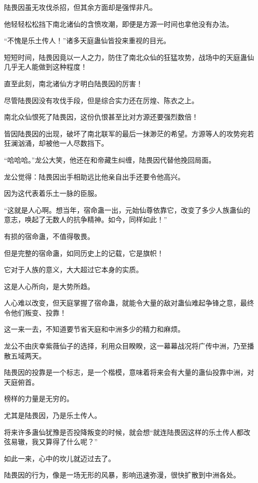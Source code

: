 
\begin{this_body}

陆畏因虽无攻伐杀招，但其余方面却是强悍非凡。

他轻轻松松挡下南北诸仙的含愤攻潮，即便是方源一时间也拿他没有办法。

“不愧是乐土传人！”诸多天庭蛊仙皆投来重视的目光。

短短时间，陆畏因竟以一人之力，防住了南北众仙的狂猛攻势，战场中的天庭蛊仙几乎无人能做到这种程度！

直至此刻，南北诸仙方才明白陆畏因的厉害！

尽管陆畏因没有攻伐手段，但是综合实力还在厉煌、陈衣之上。

南北众仙恨死了陆畏因，这份仇恨甚至比对方源还要强烈数倍！

皆因陆畏因的出现，破坏了南北联军的最后一抹渺茫的希望。方源等人的攻势宛若狂澜汹涌，却被他一人尽数挡下。

“哈哈哈。”龙公大笑，他还在和帝藏生纠缠，陆畏因代替他挽回局面。

龙公觉得：陆畏因出手相助远比他亲自出手还要令他高兴。

因为这代表着乐土一脉的臣服。

“这就是人心啊。想当年，宿命蛊一出，元始仙尊依靠它，改变了多少人族蛊仙的意志，唤起了无数人的抗争精神。如今，同样如此！”

有损的宿命蛊，不值得敬畏。

但是完整的宿命蛊，如同历史上的记载，它是旗帜！

它对于人族的意义，大大超过它本身的实质。

这是人心所向，是大势所趋。

人心难以改变，但天庭掌握了宿命蛊，就能令大量的敌对蛊仙难起争锋之意，最终令他们叛变、投靠！

这一来一去，不知道要节省天庭和中洲多少的精力和麻烦。

龙公不由庆幸紫薇仙子的选择，利用众目睽睽，这一幕幕战况将广传中洲，乃至播散五域两天。

陆畏因的投靠是一个标志，是一个楷模，意味着将来会有大量的蛊仙投靠中洲，对天庭俯首。

榜样的力量是无穷的。

尤其是陆畏因，乃是乐土传人。

将来许多蛊仙犹豫是否投降叛变的时候，就会想“就连陆畏因这样的乐土传人都改弦易辙，我又算得了什么呢？”

如此一来，心中的坎儿就迈过去了。

陆畏因的行为，像是一场无形的风暴，影响迅速弥漫，很快扩散到中洲各处。


\end{this_body}
